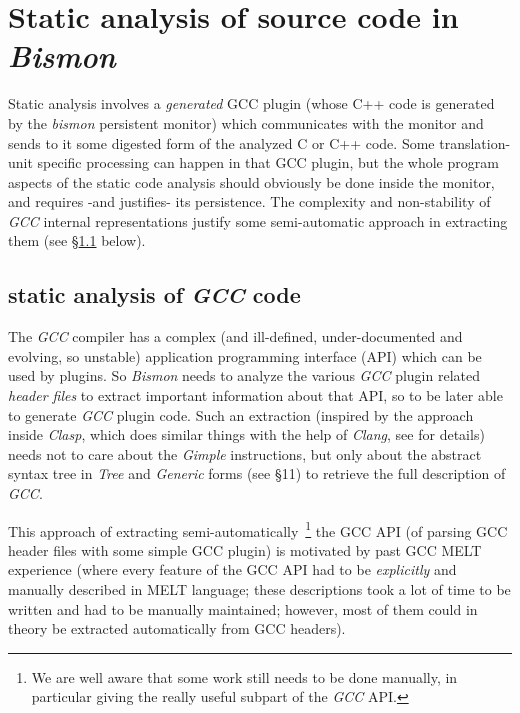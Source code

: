 \section{Static analysis of source code in \emph{Bismon}}
\label{sec:staticanalys}

Static analysis involves a \emph{generated} GCC plugin (whose C++ code
is generated by the \emph{bismon} persistent monitor) which
communicates with the monitor and sends to it some digested form of
the analyzed C or C++ code. Some translation-unit specific processing
can happen in that GCC plugin, but the whole program aspects of the
static code analysis should obviously be done inside the monitor, and
requires -and justifies- its persistence. The complexity and
non-stability of \emph{GCC} internal representations justify some
semi-automatic approach in extracting them (see \S\ref{subsec:analygcc}
below).



\subsection{static analysis of \emph{GCC} code}
\label{subsec:analygcc}

The \emph{GCC} compiler has a complex (and ill-defined,
under-documented and evolving, so unstable) application programming
interface (API) which can be used by plugins. So \emph{Bismon} needs
to analyze the various \emph{GCC} plugin related \emph{header files}
to extract important information about that API, so to be later able
to generate \emph{GCC} plugin code. Such an extraction (inspired by
the approach inside \emph{Clasp}, which does similar things with the
help of \emph{Clang}, see \cite{Schafmeister:2015:CLASP} for details)
needs not to care about the \emph{Gimple} instructions, but only about
the abstract syntax tree in \emph{Tree} and \emph{Generic} forms (see
\cite{gcc-internals} \S11) to retrieve the full description of
\emph{GCC}.

This approach of extracting semi-automatically~\footnote{We are well
  aware that some work still needs to be done manually, in particular
  giving the really useful subpart of the \emph{GCC} API.} the GCC API
(of parsing GCC header files with some simple GCC plugin) is motivated
by past GCC MELT experience (where every feature of the GCC API had to
be \emph{explicitly} and manually described in MELT language; these
descriptions took a lot of time to be written and had to be manually
maintained; however, most of them could in theory be extracted
automatically from GCC headers).

